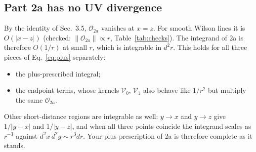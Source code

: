 \documentclass[10pt]{article}
\numberwithin{equation}{section}
\newcommand{\OO}{\mathcal O}
\newcommand{\VV}{\mathcal V}
\begin{document}
\subsection{Part 2a has no UV divergence}\label{sec:2a}
By the identity of Sec.~3.5, $\OO_{2a}$ vanishes at $x=z$. For smooth Wilson lines it is $O(|x-z|)$ (checked: $\|\OO_{2a}\|\propto r$, Table~\ref{tab:checks}). The integrand of 2a is therefore $O(1/r)$ at small $r$, which is integrable in $d^2r$. This holds for all three pieces of Eq.~\eqref{eq:plus} separately:
\begin{itemize}
\item the plus-prescribed integral;
\item the endpoint terms, whose kernels $\VV_0$, $\VV_1$ also behave like $1/r^2$ but multiply the same $\OO_{2a}$.
\end{itemize}
Other short-distance regions are integrable as well: $y\to x$ and $y\to z$ give $1/|y-x|$ and $1/|y-z|$, and when all three points coincide the integrand scales as $r^{-3}$ against $d^2x\,d^2y\sim r^3dr$. Your plus prescription of 2a is therefore complete as it stands.
\end{document}

